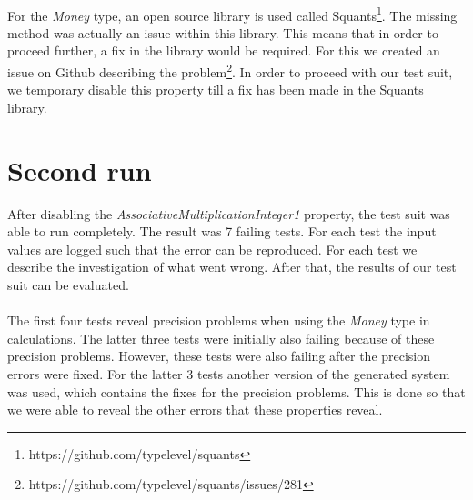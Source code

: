 \\
For the \textit{Money} type, an open source library is used called Squants\footnote{https://github.com/typelevel/squants}. The missing method was actually an issue within this library. This means that in order to proceed further, a fix in the library would be required. For this we created an issue on Github describing the problem\footnote{https://github.com/typelevel/squants/issues/281}. In order to proceed with our test suit, we temporary disable this property till a fix has been made in the Squants library.

\section{Second run}
After disabling the \textit{AssociativeMultiplicationInteger1} property, the test suit was able to run completely. The result was 7 failing tests. For each test the input values are logged such that the error can be reproduced. For each test we describe the investigation of what went wrong. After that, the results of our test suit can be evaluated.\\
\\
The first four tests reveal precision problems when using the \textit{Money} type in calculations. The latter three tests were initially also failing because of these precision problems. However, these tests were also failing after the precision errors were fixed. For the latter 3 tests another version of the generated system was used, which contains the fixes for the precision problems. This is done so that we were able to reveal the other errors that these properties reveal.

